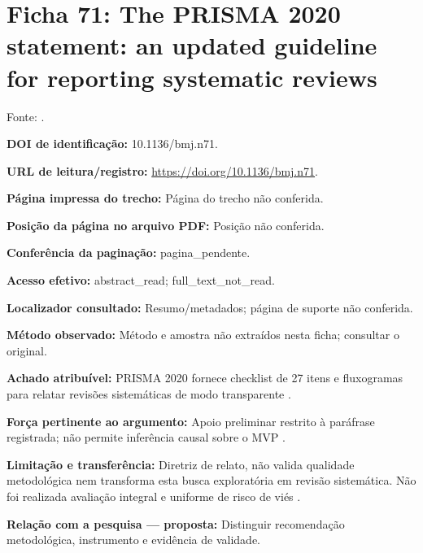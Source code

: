 \clearpage\section*{Ficha 71: The PRISMA 2020 statement: an updated guideline for reporting systematic reviews}

Fonte: \citet{SU01}.

\noindent\textbf{DOI de identificação:} 10.1136/bmj.n71.\par\medskip

\noindent\textbf{URL de leitura/registro:} \url{https://doi.org/10.1136/bmj.n71}.\par\medskip

\noindent\textbf{Página impressa do trecho:} Página do trecho não conferida.\par\medskip

\noindent\textbf{Posição da página no arquivo PDF:} Posição não conferida.\par\medskip

\noindent\textbf{Conferência da paginação:} pagina\_pendente.\par\medskip

\noindent\textbf{Acesso efetivo:} abstract\_read; full\_text\_not\_read.\par\medskip

\noindent\textbf{Localizador consultado:} Resumo/metadados; página de suporte não conferida.\par\medskip

\noindent\textbf{Método observado:} Método e amostra não extraídos nesta ficha; consultar o original.\par\medskip

\noindent\textbf{Achado atribuível:} PRISMA 2020 fornece checklist de 27 itens e fluxogramas para relatar revisões sistemáticas de modo transparente \citep{SU01}.\par\medskip

\noindent\textbf{Força pertinente ao argumento:} Apoio preliminar restrito à paráfrase registrada; não permite inferência causal sobre o MVP \citep{SU01}.\par\medskip

\noindent\textbf{Limitação e transferência:} Diretriz de relato, não valida qualidade metodológica nem transforma esta busca exploratória em revisão sistemática. Não foi realizada avaliação integral e uniforme de risco de viés \citep{SU01}.\par\medskip

\noindent\textbf{Relação com a pesquisa — proposta:} Distinguir recomendação metodológica, instrumento e evidência de validade.\par\medskip

